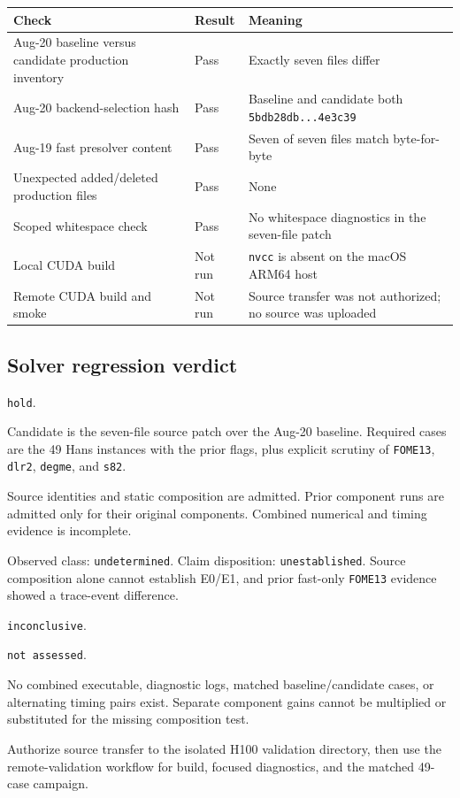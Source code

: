 \documentclass[10pt,a4paper]{article}
\begin{document}
\begin{tabularx}{\textwidth}{@{}P{0.46\textwidth}P{0.18\textwidth}Y@{}}
\toprule
\textbf{Check} & \textbf{Result} & \textbf{Meaning}\\
\midrule
Aug-20 baseline versus candidate production inventory & Pass & Exactly seven files differ\\
Aug-20 backend-selection hash & Pass & Baseline and candidate both \texttt{5bdb28db...4e3c39}\\
Aug-19 fast presolver content & Pass & Seven of seven files match byte-for-byte\\
Unexpected added/deleted production files & Pass & None\\
Scoped whitespace check & Pass & No whitespace diagnostics in the seven-file patch\\
Local CUDA build & Not run & \texttt{nvcc} is absent on the macOS ARM64 host\\
Remote CUDA build and smoke & Not run & Source transfer was not authorized; no source was uploaded\\
\bottomrule
\end{tabularx}

\subsection{Solver regression verdict}

\begin{description}[leftmargin=38mm,style=multiline]
\item[Gate decision] \texttt{hold}.
\item[Claim and frozen policy] Candidate is the seven-file source patch over the Aug-20 baseline.  Required cases are the 49 Hans instances with the prior flags, plus explicit scrutiny of \texttt{FOME13}, \texttt{dlr2}, \texttt{degme}, and \texttt{s82}.
\item[Evidence admission] Source identities and static composition are admitted.  Prior component runs are admitted only for their original components.  Combined numerical and timing evidence is incomplete.
\item[Equivalence disposition] Observed class: \texttt{undetermined}. Claim disposition: \texttt{unestablished}.  Source composition alone cannot establish E0/E1, and prior fast-only \texttt{FOME13} evidence showed a trace-event difference.
\item[Numerical verdict] \texttt{inconclusive}.
\item[Performance verdict] \texttt{not assessed}.
\item[Aggregation and decision rationale] No combined executable, diagnostic logs, matched baseline/candidate cases, or alternating timing pairs exist.  Separate component gains cannot be multiplied or substituted for the missing composition test.
\item[Handoff / next decisive action] Authorize source transfer to the isolated H100 validation directory, then use the remote-validation workflow for build, focused diagnostics, and the matched 49-case campaign.
\end{description}
\end{document}
